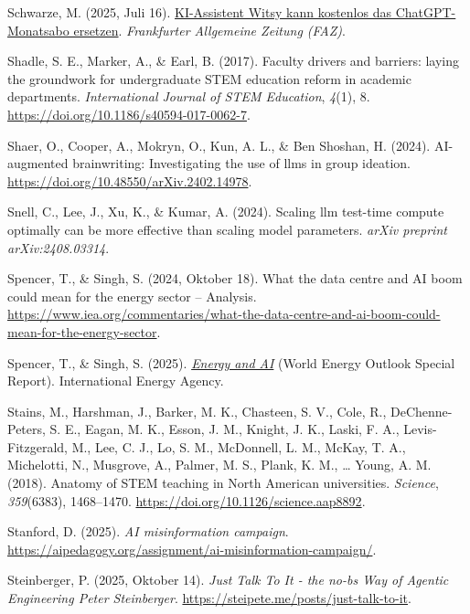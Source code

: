 \documentclass[
  ngerman,
  letterpaper,
  DIV=11]{scrreprt}
\newlength{\cslhangindent}
\newenvironment{CSLReferences}[2] %
 {\begin{list}{}{%
  \setlength{\itemindent}{0pt}
  \setlength{\leftmargin}{0pt}
  \setlength{\parsep}{0pt}
  \ifodd #1
   \setlength{\leftmargin}{\cslhangindent}
   \setlength{\itemindent}{-1\cslhangindent}
  \fi
  \setlength{\itemsep}{#2\baselineskip}}}
 {\end{list}}
\begin{document}
\begin{CSLReferences}{1}{0}
Schwarze, M. (2025, Juli 16).
\href{https://www.faz.net/pro/digitalwirtschaft/prompt-der-woche/ki-assistent-witsy-kann-kostenlos-das-chatgpt-monatsabo-ersetzen-110586296.html}{KI-Assistent
Witsy kann kostenlos das ChatGPT-Monatsabo ersetzen}. \emph{Frankfurter
Allgemeine Zeitung (FAZ)}.

Shadle, S. E., Marker, A., \& Earl, B. (2017). Faculty drivers and
barriers: laying the groundwork for undergraduate STEM education reform
in academic departments. \emph{International Journal of STEM Education},
\emph{4}(1), 8. \url{https://doi.org/10.1186/s40594-017-0062-7}.

Shaer, O., Cooper, A., Mokryn, O., Kun, A. L., \& Ben Shoshan, H.
(2024). AI-augmented brainwriting: Investigating the use of llms in
group ideation. \url{https://doi.org/10.48550/arXiv.2402.14978}.

Snell, C., Lee, J., Xu, K., \& Kumar, A. (2024). Scaling llm test-time
compute optimally can be more effective than scaling model parameters.
\emph{arXiv preprint arXiv:2408.03314}.

Spencer, T., \& Singh, S. (2024, Oktober 18). What the data centre and
AI boom could mean for the energy sector -- Analysis.
\url{https://www.iea.org/commentaries/what-the-data-centre-and-ai-boom-could-mean-for-the-energy-sector}.

Spencer, T., \& Singh, S. (2025).
\emph{\href{https://www.iea.org/reports/energy-and-ai}{Energy and AI}}
(World Energy Outlook Special Report). International Energy Agency.

Stains, M., Harshman, J., Barker, M. K., Chasteen, S. V., Cole, R.,
DeChenne-Peters, S. E., Eagan, M. K., Esson, J. M., Knight, J. K.,
Laski, F. A., Levis-Fitzgerald, M., Lee, C. J., Lo, S. M., McDonnell, L.
M., McKay, T. A., Michelotti, N., Musgrove, A., Palmer, M. S., Plank, K.
M., \ldots{} Young, A. M. (2018). Anatomy of STEM teaching in North
American universities. \emph{Science}, \emph{359}(6383), 1468--1470.
\url{https://doi.org/10.1126/science.aap8892}.

Stanford, D. (2025). \emph{AI misinformation campaign}.
\url{https://aipedagogy.org/assignment/ai-misinformation-campaign/}.

Steinberger, P. (2025, Oktober 14). \emph{Just Talk To It - the no-bs
Way of Agentic Engineering \textbar{} Peter Steinberger}.
\url{https://steipete.me/posts/just-talk-to-it}.


\end{CSLReferences}
\end{document}
